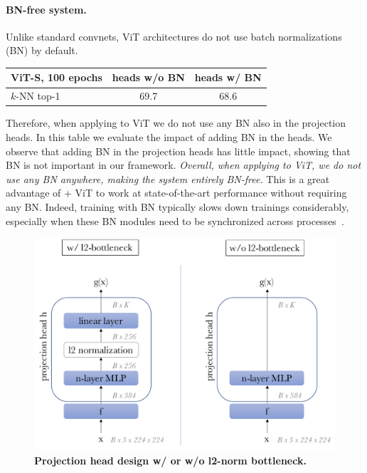 \paragraph{BN-free system.}
Unlike standard convnets, ViT architectures do not use batch normalizations (BN) by default.
\begin{table}[h!]
\vspace{-0.8em}
  \centering
  \begin{tabular}{@{}l c c@{}}
	  ViT-S, 100 epochs & heads w/o BN & heads w/ BN \\
    \midrule
	  $k$-NN top-1 & \colorbox{Light}{69.7} & 68.6 \\
  \end{tabular}
\vspace{-0.8em}
\end{table}
Therefore, when applying \OURS to ViT we do not use any BN also in the projection heads.
In this table we evaluate the impact of adding BN in the heads.
We observe that adding BN in the projection heads has little impact, showing that BN is not important in our framework.
\emph{Overall, when applying \OURS to ViT, we do not use any BN anywhere, making the system entirely BN-free.}
This is a great advantage of \OURS + ViT to work at state-of-the-art performance without requiring any BN.
Indeed, training with BN typically slows down trainings considerably, especially when these BN modules need to be synchronized across processes~\cite{he2020momentum,caron2020unsupervised,caron2019unsupervised,grill2020bootstrap}.
\begin{figure}[h!]
\centering
\includegraphics[width=\linewidth]{head_design.pdf}
	\caption{
    \textbf{Projection head design w/ or w/o l2-norm bottleneck.}
  }
\label{fig:proj}
\end{figure}

